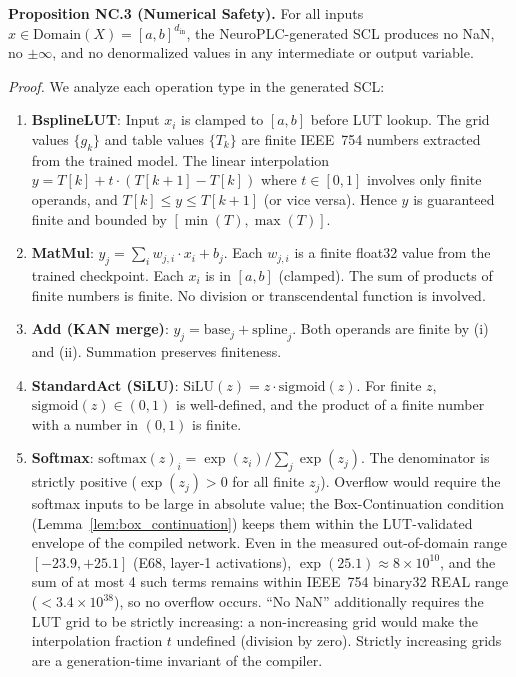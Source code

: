 \vspace{4pt}
\noindent\textbf{Proposition NC.3 (Numerical Safety).}
\label{prop:numerical_safety}
For all inputs $x \in \text{Domain}(X) = [a,b]^{d_{\text{in}}}$,
the NeuroPLC-generated SCL produces no NaN, no $\pm\infty$, and no
denormalized values in any intermediate or output variable.

\vspace{2pt}
\noindent\textit{Proof.}
We analyze each operation type in the generated SCL:

\begin{enumerate}[label=(\roman*)]
    \item \textbf{BsplineLUT}: Input $x_i$ is clamped to $[a,b]$
    before LUT lookup. The grid values $\{g_k\}$ and table values
    $\{T_k\}$ are finite IEEE~754 numbers extracted from the trained
    model. The linear interpolation
    $y = T[k] + t \cdot (T[k+1] - T[k])$ where
    $t \in [0,1]$ involves only finite operands, and
    $T[k] \leq y \leq T[k+1]$ (or vice versa). Hence
    $y$ is guaranteed finite and bounded by
    $[\min(T), \max(T)]$.

    \item \textbf{MatMul}: $y_j = \sum_i w_{j,i} \cdot x_i + b_j$.
    Each $w_{j,i}$ is a finite float32 value from the trained
    checkpoint. Each $x_i$ is in $[a,b]$ (clamped). The sum of
    products of finite numbers is finite. No division or
    transcendental function is involved.

    \item \textbf{Add (KAN merge)}: $y_j = \text{base}_j +
    \text{spline}_j$. Both operands are finite by (i) and (ii).
    Summation preserves finiteness.

    \item \textbf{StandardAct (SiLU)}: $\text{SiLU}(z) = z \cdot
    \text{sigmoid}(z)$. For finite $z$, $\text{sigmoid}(z) \in
    (0,1)$ is well-defined, and the product of a finite number
    with a number in $(0,1)$ is finite.

    \item \textbf{Softmax}: $\text{softmax}(z)_i = \exp(z_i) /
    \sum_j \exp(z_j)$. The denominator is strictly positive
    ($\exp(z_j) > 0$ for all finite $z_j$). Overflow would require
    the softmax inputs to be large in absolute value; the
    Box-Continuation condition
    (Lemma~\ref{lem:box_continuation}) keeps them within the
    LUT-validated envelope of the compiled network. Even in the
    measured out-of-domain range $[-23.9, +25.1]$ (E68, layer-1
    activations), $\exp(25.1) \approx 8 \times 10^{10}$, and the
    sum of at most 4 such terms remains within IEEE~754 binary32
    REAL range ($< 3.4 \times 10^{38}$), so no overflow occurs.
    ``No NaN'' additionally requires the LUT grid to be strictly
    increasing: a non-increasing grid would make the interpolation
    fraction $t$ undefined (division by zero). Strictly increasing
    grids are a generation-time invariant of the compiler.
\end{enumerate}

